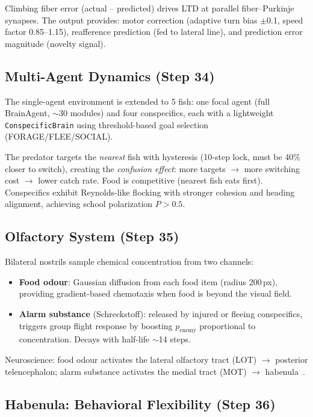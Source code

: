 \documentclass[11pt,a4paper]{article}
\begin{document}
Climbing fiber error (actual -- predicted) drives LTD at parallel
fiber--Purkinje synapses.  The output provides:
motor correction (adaptive turn bias $\pm$0.1, speed factor 0.85--1.15),
reafference prediction (fed to lateral line), and prediction error
magnitude (novelty signal).

\subsection{Multi-Agent Dynamics (Step 34)}

The single-agent environment is extended to 5 fish: one focal agent
(full BrainAgent, $\sim$30 modules) and four conspecifics, each with
a lightweight \texttt{ConspecificBrain} using threshold-based goal
selection (FORAGE/FLEE/SOCIAL).

The predator targets the \emph{nearest} fish with hysteresis
(10-step lock, must be 40\% closer to switch), creating the
\emph{confusion effect}: more targets $\to$ more switching cost
$\to$ lower catch rate.  Food is competitive (nearest fish eats first).
Conspecifics exhibit Reynolds-like flocking with stronger cohesion
and heading alignment, achieving school polarization $P > 0.5$.

\subsection{Olfactory System (Step 35)}

Bilateral nostrils sample chemical concentration from two channels:
\begin{itemize}[nosep]
  \item \textbf{Food odour}: Gaussian diffusion from each food item
    (radius 200\,px), providing gradient-based chemotaxis when food
    is beyond the visual field.
  \item \textbf{Alarm substance} (Schreckstoff): released by injured
    or fleeing conspecifics, triggers group flight response by boosting
    $p_\text{enemy}$ proportional to concentration.  Decays with
    half-life $\sim$14 steps.
\end{itemize}
Neuroscience: food odour activates the lateral olfactory tract (LOT)
$\to$ posterior telencephalon; alarm substance activates the medial
tract (MOT) $\to$ habenula~\cite{jesuthasan2012}.

\subsection{Habenula: Behavioral Flexibility (Step 36)}
\end{document}
